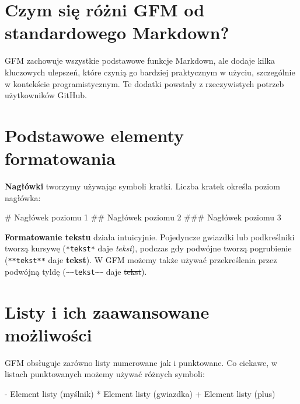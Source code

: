 \documentclass[
  polish,
  letterpaper,
  DIV=11,
  numbers=noendperiod]{scrreprt}
\newenvironment{Shaded}{\begin{snugshade}}{\end{snugshade}}
\newcommand{\FunctionTok}[1]{\textcolor[rgb]{0.28,0.35,0.67}{#1}}
\newcommand{\NormalTok}[1]{\textcolor[rgb]{0.00,0.23,0.31}{#1}}
\newcommand{\SpecialStringTok}[1]{\textcolor[rgb]{0.13,0.47,0.30}{#1}}
\begin{document}
\section{Czym się różni GFM od standardowego
Markdown?}\label{czym-siux119-ruxf3ux17cni-gfm-od-standardowego-markdown}

GFM zachowuje wszystkie podstawowe funkcje Markdown, ale dodaje kilka
kluczowych ulepszeń, które czynią go bardziej praktycznym w użyciu,
szczególnie w kontekście programistycznym. Te dodatki powstały z
rzeczywistych potrzeb użytkowników GitHub.

\section{Podstawowe elementy
formatowania}\label{podstawowe-elementy-formatowania}

\textbf{Nagłówki} tworzymy używając symboli kratki. Liczba kratek
określa poziom nagłówka:

\begin{Shaded}
\begin{Highlighting}[]
\FunctionTok{\# Nagłówek poziomu 1}
\FunctionTok{\#\# Nagłówek poziomu 2}
\FunctionTok{\#\#\# Nagłówek poziomu 3}
\end{Highlighting}
\end{Shaded}

\textbf{Formatowanie tekstu} działa intuicyjnie. Pojedyncze gwiazdki lub
podkreślniki tworzą kursywę (\texttt{*tekst*} daje \emph{tekst}),
podczas gdy podwójne tworzą pogrubienie (\texttt{**tekst**} daje
\textbf{tekst}). W GFM możemy także używać przekreślenia przez podwójną
tyldę
(\texttt{\textasciitilde{}\textasciitilde{}tekst\textasciitilde{}\textasciitilde{}}
daje \st{tekst}).

\section{Listy i ich zaawansowane
możliwości}\label{listy-i-ich-zaawansowane-moux17cliwoux15bci}

GFM obsługuje zarówno listy numerowane jak i punktowane. Co ciekawe, w
listach punktowanych możemy używać różnych symboli:

\begin{Shaded}
\begin{Highlighting}[]
\SpecialStringTok{{-} }\NormalTok{Element listy (myślnik)}
\SpecialStringTok{* }\NormalTok{Element listy (gwiazdka)}
\SpecialStringTok{+ }\NormalTok{Element listy (plus)}
\end{Highlighting}
\end{Shaded}
\end{document}
